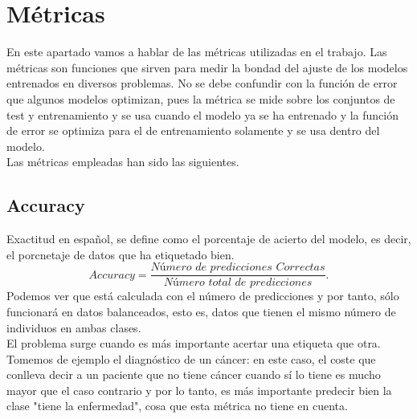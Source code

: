 \section{Métricas}\label{Metricas}
En este apartado vamos a hablar de las métricas utilizadas en el trabajo. Las métricas son funciones que sirven para medir la bondad del ajuste de los modelos entrenados en diversos problemas. No se debe confundir con la función de error que algunos modelos optimizan, pues la métrica se mide sobre los conjuntos de test y entrenamiento y se usa cuando el modelo ya se ha entrenado y la función de error se optimiza para el de entrenamiento solamente y se usa dentro del modelo.\\
Las métricas empleadas han sido las siguientes.
\subsection{Accuracy}
Exactitud en español, se define como el porcentaje de acierto del modelo, es decir, el porcnetaje de datos que ha etiquetado bien.
\[ Accuracy=\frac{\textit{Número de predicciones Correctas}}{\textit{Número total de predicciones}}. \]
Podemos ver que está calculada con el número de predicciones y por tanto, sólo funcionará en datos balanceados, esto es, datos que tienen el mismo número de individuos en ambas clases.\\
El problema surge cuando es más importante acertar una etiqueta que otra. Tomemos de ejemplo el diagnóstico de un cáncer: en este caso, el coste que conlleva decir a un paciente que no tiene cáncer cuando sí lo tiene es mucho mayor que el caso contrario y por lo tanto, es más importante predecir bien la clase "tiene la enfermedad", cosa que esta métrica no tiene en cuenta.
